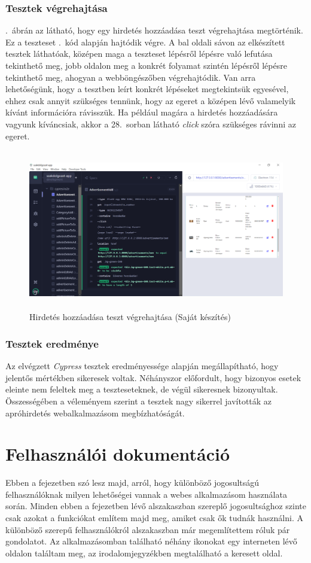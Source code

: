 \documentclass[]{thesis-ekf}
\theoremstyle{definition}
\theoremstyle{remark}
\begin{document}
	\subsection{Tesztek végrehajtása}
		.~ábrán az látható, hogy egy hirdetés hozzáadása teszt végrehajtása megtörténik. Ez a teszteset .~kód alapján hajtódik végre. A bal oldali sávon az elkészített tesztek láthatóak, középen maga a teszteset lépésről lépésre való lefutása tekinthető meg, jobb oldalon meg a konkrét folyamat szintén lépésről lépésre tekinthető meg, ahogyan a webböngészőben végrehajtódik. Van arra lehetőségünk, hogy a tesztben leírt konkrét lépéseket megtekintsük egyesével, ehhez csak annyit szükséges tennünk, hogy az egeret a középen lévő valamelyik kívánt információra rávisszük. Ha például magára a hirdetés hozzáadására vagyunk kíváncsiak, akkor a 28.~sorban látható \emph{click} szóra szükséges rávinni az egeret.
		\begin{figure}[ht!]
			\centering
			\includegraphics[height=7cm]{./teszteles/teszt}
			\caption{Hirdetés hozzáadása teszt végrehajtása (Saját készítés)} 
			\label{teszt-vegrehajtasa}
		\end{figure}
		
	\subsection{Tesztek eredménye}
		Az elvégzett \emph{Cypress} tesztek eredményessége alapján megállapítható, hogy jelentős mértékben sikeresek voltak. Néhányszor előfordult, hogy bizonyos esetek eleinte nem feleltek meg a teszteseteknek, de végül sikeresnek bizonyultak. Összességében a véleményem szerint a tesztek nagy sikerrel javították az apróhirdetés webalkalmazásom megbízhatóságát.   
		
	\chapter{Felhasználói dokumentáció}\label{ch-felhasznaloi}
		Ebben a fejezetben szó lesz majd, arról, hogy különböző jogosultságú felhasználóknak milyen lehetőségei vannak a webes alkalmazásom használata során. Minden ebben a fejezetben lévő alszakaszban szereplő jogosultsághoz szinte csak azokat a funkciókat említem majd meg, amiket csak ők tudnák használni. A különböző szerepű felhasználókról \az{\ref{sc-plantuml}} alszakaszban már megemlítettem róluk pár gondolatot. Az alkalmazásomban található néhány ikonokat egy interneten lévő oldalon találtam meg, az irodalomjegyzékben megtalálható a keresett oldal.\cite{Ikon} 
\end{document}
